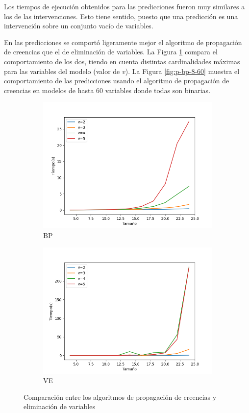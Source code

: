 Los tiempos de ejecución obtenidos para las predicciones fueron muy similares a los de las intervenciones. Esto tiene sentido, puesto que una predicción es una intervención sobre un conjunto vacío de variables. 

En las predicciones se comportó ligeramente mejor el algoritmo de propagación de creencias que el de eliminación de variables. La Figura \ref{fig:p-24} compara el comportamiento de los dos, tiendo en cuenta distintas cardinalidades máximas para las variables del modelo (valor de $v$).  La Figura \ref{fig:p-bp-8-60} muestra el comportamiento de las predicciones usando el algoritmo de propagación de creencias en modelos de hasta 60 variables donde todas son binarias.

\begin{figure}[h!]
	\centering
	\begin{subfigure}{.49\linewidth}
		\includegraphics[width=\linewidth]{./images/Chapter-3/p-bp-8-24}
		\caption{BP}
	\end{subfigure}
	\begin{subfigure}{.49\linewidth}
		\includegraphics[width=\linewidth]{./images/Chapter-3/p-ve-8-24}
		\caption{VE}
	\end{subfigure}
	\caption{Comparación entre los algoritmos de propagación de creencias y eliminación de variables}
	\label{fig:p-24}
\end{figure}

